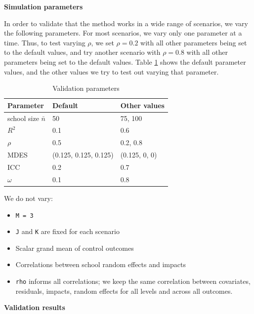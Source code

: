 \documentclass[
]{jss}
\providecommand{\tightlist}{%
  \setlength{\itemsep}{0pt}\setlength{\parskip}{0pt}}
\begin{document}
\textbf{Simulation parameters}

In order to validate that the method works in a wide range of scenarios,
we vary the following parameters. For most scenarios, we vary only one
parameter at a time. Thus, to test varying \(\rho\), we set
\(\rho = 0.2\) with all other parameters being set to the default
values, and try another scenario with \(\rho = 0.8\) with all other
parameters being set to the default values. Table \ref{tab:val_params}
shows the default parameter values, and the other values we try to test
out varying that parameter.

\begin{table}[h!]
\centering
\begin{tabular}{l l l}
Parameter               & Default                & Other values \\ \hline
school size $\bar{n}$   & 50                     & 75, 100           \\
$R^2$                   & 0.1                    & 0.6               \\
$\rho$                  & 0.5                    & 0.2, 0.8          \\
MDES                    & (0.125, 0.125, 0.125)  & (0.125, 0, 0)     \\
ICC                     & 0.2                    & 0.7               \\
$\omega$                & 0.1                    & 0.8               \\
\end{tabular}
\label{tab:val_params}
\caption{Validation parameters}
\end{table}

We do not vary:

\begin{itemize}
\tightlist
\item
  \texttt{M\ =\ 3}
\item
  \texttt{J} and \texttt{K} are fixed for each scenario
\item
  Scalar grand mean of control outcomes
\item
  Correlations between school random effects and impacts
\item
  \texttt{rho} informs all correlations; we keep the same correlation
  between covariates, residuals, impacts, random effects for all levels
  and across all outcomes.
\end{itemize}

\textbf{Validation results}
\end{document}
